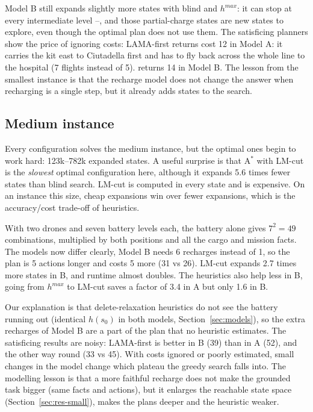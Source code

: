 \documentclass[11pt,a4paper]{article}
\newcommand{\p}[1]{\texttt{\detokenize{#1}}}
\begin{document}
Model B still expands slightly more states with blind and
$h^{max}$: it can stop at every intermediate level \p{b1}--\p{b4}, and those 
partial-charge states are new states to explore, even though the optimal plan 
does not use them. The satisficing planners show the price of ignoring costs: 
LAMA-first returns cost 12 in Model A: it carries the kit east to Ciutadella 
first and has to fly back across the whole line to the hospital (7 flights 
instead of 5). \p{gbfs-ff} returns 14 in Model B. The
lesson from the smallest instance is that the recharge model does not change
the answer when recharging is a single step, but it already adds states to
the search.

\subsection{Medium instance}
Every configuration solves the medium instance, but the optimal ones begin to
work hard: 123k--782k expanded states. A useful surprise is that A$^*$ with
LM-cut is the \emph{slowest} optimal configuration here, although it expands
 5.6 times fewer states than blind search. LM-cut is computed in every state and is expensive. On an
instance this size, cheap expansions win over fewer expansions, which is the
accuracy/cost trade-off of heuristics. 

With two drones and seven battery levels each, the battery alone gives $7^2 = 49$ combinations,
multiplied by both positions and all the cargo and mission facts. The models now differ clearly, 
Model B needs 6 recharges instead of 1, so the plan is 5 actions longer and costs 5 more (31 vs 26). 
LM-cut expands 2.7 times more states in B, and runtime almost doubles. The heuristics also help less in
B, going from $h^{max}$ to LM-cut saves a factor of 3.4 in A but only 1.6 in
B. 

Our explanation is that delete-relaxation heuristics do not see the
battery running out (identical $h(s_0)$ in both models,
Section~\ref{sec:models}), so the extra recharges of
Model B are a part of the plan that no heuristic estimates. The satisficing
results are noisy: LAMA-first is better in B (39) than in A (52), and
\p{gbfs-ff} the other way round (33 vs 45). With costs ignored or poorly
estimated, small changes in the model change which plateau the greedy search
falls into. The modelling lesson is that a more faithful recharge does not
make the grounded task bigger (same facts and actions), but it enlarges the
reachable state space (Section~\ref{sec:res-small}), makes the plans deeper and the heuristic weaker.
\end{document}
